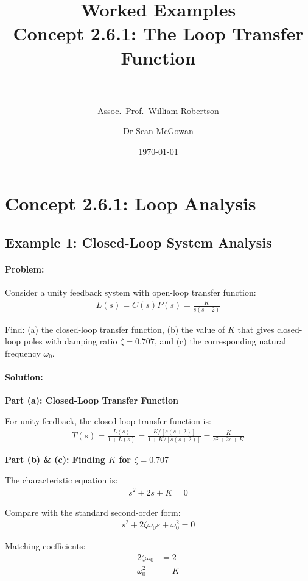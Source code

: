 \documentclass[11pt,a4paper]{article}
\title{\textbf{Worked Examples}\\[0.5em]
\large Concept 2.6.1: The Loop Transfer Function\\[0.3em]
\normalsize \coursesubtitle{} -- \coursetitle}
\author{Assoc.\ Prof.\ William Robertson \and Dr Sean McGowan}
\date{\today}
\begin{document}
\maketitle
\tableofcontents
\newpage

\section{Concept 2.6.1: Loop Analysis}

\subsection{Example 1: Closed-Loop System Analysis}

\paragraph{Problem:} Consider a unity feedback system with open-loop transfer function:
\begin{align}
  L(s) = C(s)P(s) = \frac{K}{s(s+2)}
\end{align}

Find: (a) the closed-loop transfer function, (b) the value of $K$ that gives closed-loop poles with damping ratio $\zeta = 0.707$, and (c) the corresponding natural frequency $\omega_0$.

\paragraph{Solution:}

\textbf{Part (a): Closed-Loop Transfer Function}

For unity feedback, the closed-loop transfer function is:
\begin{align}
  T(s) = \frac{L(s)}{1 + L(s)} = \frac{K/[s(s+2)]}{1 + K/[s(s+2)]} = \frac{K}{s^2 + 2s + K}
\end{align}

\textbf{Part (b) \& (c): Finding $K$ for $\zeta = 0.707$}

The characteristic equation is:
\begin{align}
  s^2 + 2s + K = 0
\end{align}

Compare with the standard second-order form:
\begin{align}
  s^2 + 2\zeta\omega_0 s + \omega_0^2 = 0
\end{align}

Matching coefficients:
\begin{align}
  2\zeta\omega_0 &= 2 \\
  \omega_0^2 &= K
\end{align}
\end{document}

